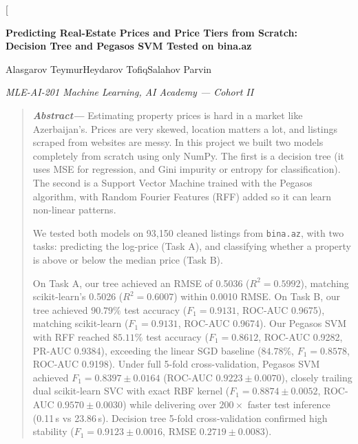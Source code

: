 \documentclass[10pt,twocolumn,a4paper]{article}
\newcommand{\abstractkw}[1]{\noindent\textbf{\textit{#1}}}
\begin{document}
  \twocolumn[
    \begin{@twocolumnfalse}
    \begin{center}
      {\LARGE\bfseries Predicting Real-Estate Prices and Price Tiers from Scratch:\\
      \Large Decision Tree and Pegasos SVM Tested on bina.az\par}
      \vspace{0.9em}
      {\large
        Alasgarov Teymur\quad Heydarov Tofiq\quad Salahov Parvin\par}
      \vspace{0.4em}
      {\itshape MLE-AI-201 Machine Learning, AI Academy --- Cohort II\par}
      \vspace{0.9em}
    \end{center}
    \begin{quote}
      \small
      \abstractkw{Abstract---}%
      Estimating property prices is hard in a market like Azerbaijan's. Prices are very skewed, location matters a lot, and listings scraped from websites are messy. In this project we built two models completely from scratch using only NumPy. The first is a decision tree (it uses MSE for regression, and Gini impurity or entropy for classification). The second is a Support Vector Machine trained with the Pegasos algorithm, with Random Fourier Features (RFF) added so it can learn non-linear patterns.

      We tested both models on 93,150 cleaned listings from \texttt{bina.az}, with two tasks: predicting the log-price (Task A), and classifying whether a property is above or below the median price (Task B).

      On Task A, our tree achieved an RMSE of 0.5036 ($R^2 = 0.5992$), matching scikit-learn's 0.5026 ($R^2 = 0.6007$) within 0.0010 RMSE. On Task B, our tree achieved $90.79\%$ test accuracy ($F_1 = 0.9131$, ROC-AUC 0.9675), matching scikit-learn ($F_1 = 0.9131$, ROC-AUC 0.9674). Our Pegasos SVM with RFF reached $85.11\%$ test accuracy ($F_1 = 0.8612$, ROC-AUC 0.9282, PR-AUC 0.9384), exceeding the linear SGD baseline ($84.78\%$, $F_1 = 0.8578$, ROC-AUC 0.9198). Under full 5-fold cross-validation, Pegasos SVM achieved $F_1 = 0.8397 \pm 0.0164$ (ROC-AUC $0.9223 \pm 0.0070$), closely trailing dual scikit-learn SVC with exact RBF kernel ($F_1 = 0.8874 \pm 0.0052$, ROC-AUC $0.9570 \pm 0.0030$) while delivering over $200\times$ faster test inference (0.11\,s vs 23.86\,s). Decision tree 5-fold cross-validation confirmed high stability ($F_1 = 0.9123 \pm 0.0016$, RMSE $0.2719 \pm 0.0083$).


\end{quote}
\end{@twocolumnfalse}
\end{document}
